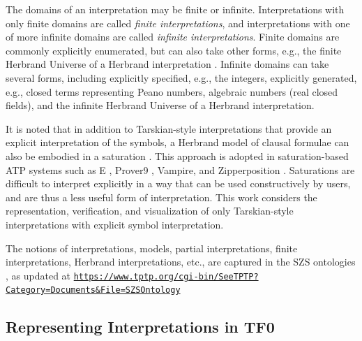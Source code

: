 \documentclass[letterpaper]{article}
\newcommand{\smalltt}[1]{\small \texttt{#1}}
\begin{document}
The domains of an interpretation may be finite or infinite.
Interpretations with only finite domains are called {\em finite interpretations}, and
interpretations with one of more infinite domains are called {\em infinite interpretations}.
Finite domains are commonly explicitly enumerated, but can also take other forms, e.g., the 
finite Herbrand Universe of a Herbrand interpretation \cite{Her30}.
Infinite domains can take several forms, including explicitly specified, e.g., the integers,
explicitly generated, e.g., closed terms representing Peano numbers, algebraic numbers (real
closed fields), and the infinite Herbrand Universe of a Herbrand interpretation.

It is noted that in addition to Tarskian-style interpretations that provide an explicit
interpretation of the symbols, a Herbrand model of clausal formulae can also be embodied in a 
saturation \cite{BG+01}.
This approach is adopted in saturation-based ATP systems such as E \cite{SCV19}, 
Prover9 \cite{McC-Prover9-URL}, Vampire, and Zipperposition \cite{VB+21}.
Saturations are difficult to interpret explicitly in a way that can be used constructively by 
users, and are thus a less useful form of interpretation.
This work considers the representation, verification, and visualization of only Tarskian-style 
interpretations with explicit symbol interpretation.

The notions of interpretations, models, partial interpretations, finite interpretations,
Herbrand interpretations, etc., are captured in the SZS ontologies \cite{Sut08-KEAPPA}, as
updated at 
\smalltt{\url{https://www.tptp.org/cgi-bin/SeeTPTP?Category=Documents\&File=SZSOntology}}

 
\subsection{Representing Interpretations in TF0}
\label{InterpretationsTF0}
\end{document}
